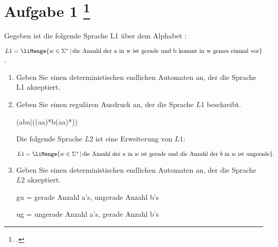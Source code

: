 \documentclass{lehramt-informatik-aufgabe}
\begin{document}
\let\m=\liMenge

\section{Aufgabe 1
\footcite{46115:2010:03}}

Gegeben ist die folgende Sprache L1 über dem Alphabet :

$L1 = \m{w \in \Sigma^* \, | \, \text{die Anzahl der a in w ist gerade und b kommt in w genau einmal vor}}$.

\begin{enumerate}


\item Geben Sie einen deterministischen endlichen Automaten an, der die
Sprache L1 akzeptiert.


\item Geben Sie einen regulären Ausdruck an, der die Sprache $L1$
beschreibt.

\begin{liAntwort}
(aba|((aa)*b(aa)*))
\end{liAntwort}

Die folgende Sprache $L2$ ist eine Erweiterung von $L1$:

$L1 = \m{w \in \Sigma^* \, | \, \text{die Anzahl der } a \text{ in } w \text{ ist gerade und die Anzahl der } b \text{ in } w \text{ ist ungerade}}.$


\item Geben Sie einen deterministischen endlichen Automaten an, der die
Sprache $L2$ akzeptiert.

\begin{liAntwort}

gu = gerade Anzahl a’s, ungerade Anzahl b’s

ug = ungerade Anzahl a’s, gerade Anzahl b’s

\def\z#1{$Z_{#1}$}

\begin{center}
\end{center}
\end{liAntwort}
\end{enumerate}
\end{document}

